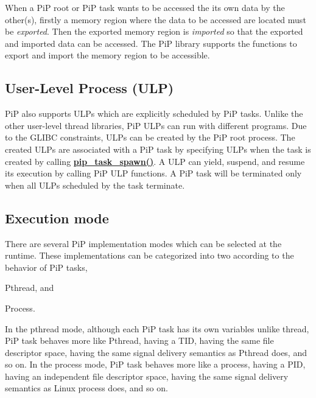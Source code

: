 When a Pi\-P root or Pi\-P task wants to be accessed the its own data by the other(s), firstly a memory region where the data to be accessed are located must be {\itshape exported}. Then the exported memory region is {\itshape imported} so that the exported and imported data can be accessed. The Pi\-P library supports the functions to export and import the memory region to be accessible.\hypertarget{group__pip-overview_PiP}{}\subsection{User-\/\-Level Process (\-U\-L\-P)}\label{group__pip-overview_PiP}
Pi\-P also supports U\-L\-Ps which are explicitly scheduled by Pi\-P tasks. Unlike the other user-\/level thread libraries, Pi\-P U\-L\-Ps can run with different programs. Due to the G\-L\-I\-B\-C constraints, U\-L\-Ps can be created by the Pi\-P root process. The created U\-L\-Ps are associated with a Pi\-P task by specifying U\-L\-Ps when the task is created by calling {\bfseries \hyperlink{group__libpip_ga8055012fb65183ce17ad8cd8da292d54}{pip\-\_\-task\-\_\-spawn()}}. A U\-L\-P can yield, suspend, and resume its execution by calling Pi\-P U\-L\-P functions. A Pi\-P task will be terminated only when all U\-L\-Ps scheduled by the task terminate.\hypertarget{group__pip-overview_execution-mode}{}\subsection{Execution mode}\label{group__pip-overview_execution-mode}
There are several Pi\-P implementation modes which can be selected at the runtime. These implementations can be categorized into two according to the behavior of Pi\-P tasks,


\begin{DoxyItemize}
\item {\ttfamily Pthread}, and
\item {\ttfamily Process}.
\end{DoxyItemize}

In the pthread mode, although each Pi\-P task has its own variables unlike thread, Pi\-P task behaves more like Pthread, having a T\-I\-D, having the same file descriptor space, having the same signal delivery semantics as Pthread does, and so on. In the process mode, Pi\-P task behaves more like a process, having a P\-I\-D, having an independent file descriptor space, having the same signal delivery semantics as Linux process does, and so on.

